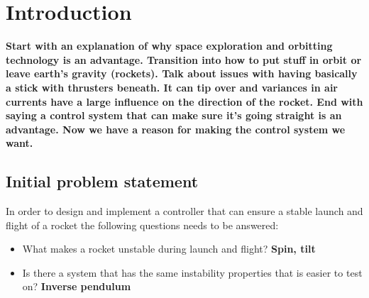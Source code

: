\chapter{Introduction}
\textbf{Start with an explanation of why space exploration and orbitting technology is an advantage. Transition into how to put stuff in orbit or leave earth's gravity (rockets). Talk about issues with having basically a stick with thrusters beneath. It can tip over and variances in air currents have a large influence on the direction of the rocket. End with saying a control system that can make sure it's going straight is an advantage. Now we have a reason for making the control system we want.}

\section{Initial problem statement}
In order to design and implement a controller that can ensure a stable launch and flight of a rocket the following questions needs to be answered: 
\begin{itemize}
\item What makes a rocket unstable during launch and flight? \textbf{Spin, tilt}
\item Is there a system that has the same instability properties that is easier to test on? \textbf{Inverse pendulum}
\end{itemize}
